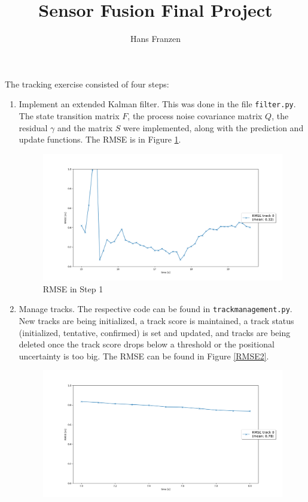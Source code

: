 \documentclass[11pt, a4paper]{amsart}
\title{Sensor Fusion Final Project}
\author{Hans Franzen}
\date{}
\begin{document}
	\maketitle
	
	The tracking exercise consisted of four steps:
	\begin{enumerate}
		\item Implement an extended Kalman filter. This was done in the file \texttt{filter.py}. The state transition matrix $F$, the process noise covariance matrix $Q$, the residual $\gamma$ and the matrix $S$ were implemented, along with the prediction and update functions. The RMSE is in Figure \ref{RMSE1}.
		\begin{figure}
			\includegraphics[scale=0.4]{../images_output/RMSE1.png}
			\caption{RMSE in Step 1}
			\label{RMSE1}
		\end{figure}
		\item Manage tracks. The respective code can be found in \texttt{trackmanagement.py}. New tracks are being initialized, a track score is maintained, a track status (initialized, tentative, confirmed) is set and updated, and tracks are being deleted once the track score drops below a threshold or the positional uncertainty is too big. The RMSE can be found in Figure \ref{RMSE2}.
		\begin{figure}
			\includegraphics[scale=0.4]{../images_output/RMSE2.png}

\end{figure}
\end{enumerate}
\end{document}
